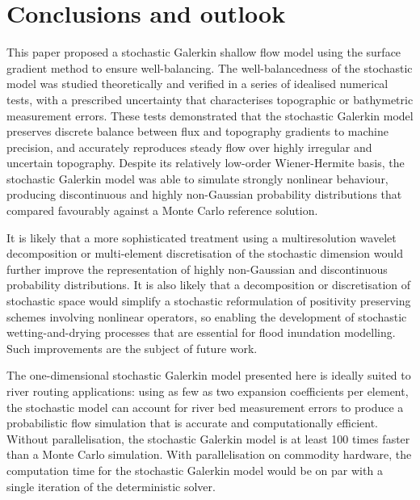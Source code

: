 \section{Conclusions and outlook}

This paper proposed a stochastic Galerkin shallow flow model using the surface gradient method to ensure well-balancing.
The well-balancedness of the stochastic model was studied theoretically and verified in a series of idealised numerical tests, with a prescribed uncertainty that characterises topographic or bathymetric measurement errors.
These tests demonstrated that the stochastic Galerkin model preserves discrete balance between flux and topography gradients to machine precision, and accurately reproduces steady flow over highly irregular and uncertain topography.
Despite its relatively low-order Wiener-Hermite basis, the stochastic Galerkin model was able to simulate strongly nonlinear behaviour, producing discontinuous and highly non-Gaussian probability distributions that compared favourably against a Monte Carlo reference solution.

It is likely that a more sophisticated treatment using a multiresolution wavelet decomposition \citep{lemaitre2004a,pettersson2014} or multi-element discretisation of the stochastic dimension \citep{wan-karniadakis2006,li-stinis2015} would further improve the representation of highly non-Gaussian and discontinuous probability distributions.
It is also likely that a decomposition or discretisation of stochastic space would simplify a stochastic reformulation of positivity preserving schemes involving nonlinear operators, so enabling the development of stochastic wetting-and-drying processes that are essential for flood inundation modelling.
Such improvements are the subject of future work.

The one-dimensional stochastic Galerkin model presented here is ideally suited to river routing applications:
using as few as two expansion coefficients per element, the stochastic model can account for river bed measurement errors to produce a probabilistic flow simulation that is accurate and computationally efficient.
Without parallelisation, the stochastic Galerkin model is at least 100 times faster than a Monte Carlo simulation.
With parallelisation on commodity hardware, the computation time for the stochastic Galerkin model would be on par with a single iteration of the deterministic solver.




